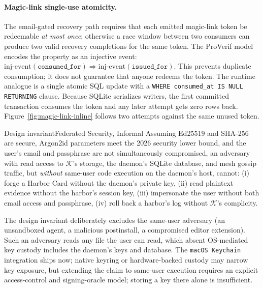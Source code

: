 \documentclass[11pt,a4paper]{article}
\theoremstyle{definition}
\theoremstyle{remark}
\begin{document}


\paragraph{Magic-link single-use atomicity.} The email-gated recovery path requires that each emitted magic-link token be redeemable \emph{at most once}; otherwise a race window between two consumers can produce two valid recovery completions for the same token. The ProVerif model~ encodes the property as an injective event: $\mathrm{inj\text{-}event}(\texttt{consumed\_for}) \Rightarrow \mathrm{inj\text{-}event}(\texttt{issued\_for})$. This prevents duplicate consumption; it does not guarantee that anyone redeems the token. The runtime analogue is a single atomic SQL update with a \texttt{WHERE consumed\_at IS NULL RETURNING} clause. Because SQLite serializes writers, the first committed transaction consumes the token and any later attempt gets zero rows back. Figure~\ref{fig:magic-link-inline} follows two attempts against the same unused token.



\begin{pdclaim}{Design invariant}{Federated Security, Informal}
\setlength{\parskip}{4pt plus 1pt}
\label{thm:federated-security}
Assuming Ed25519 and SHA-256 are secure, Argon2id parameters meet the 2026 security lower bound, and the user's email and passphrase are not simultaneously compromised, an adversary with read access to $\mathcal{K}$'s storage, the daemon's SQLite database, and mesh gossip traffic, but \emph{without} same-user code execution on the daemon's host, cannot:
(i) forge a Harbor Card without the daemon's private key,
(ii) read plaintext evidence without the harbor's session key,
(iii) impersonate the user without both email access and passphrase,
(iv) roll back a harbor's log without $\mathcal{K}$'s complicity.
\end{pdclaim}

The design invariant deliberately excludes the same-user adversary (an unsandboxed agent, a malicious postinstall, a compromised editor extension). Such an adversary reads any file the user can read, which absent OS-mediated key custody includes the daemon's keys and database. The \texttt{macOS Keychain} integration ships now; native keyring or hardware-backed custody may narrow key exposure, but
extending the claim to same-user execution requires an explicit access-control
and signing-oracle model; storing a key there alone is insufficient.
\end{document}
